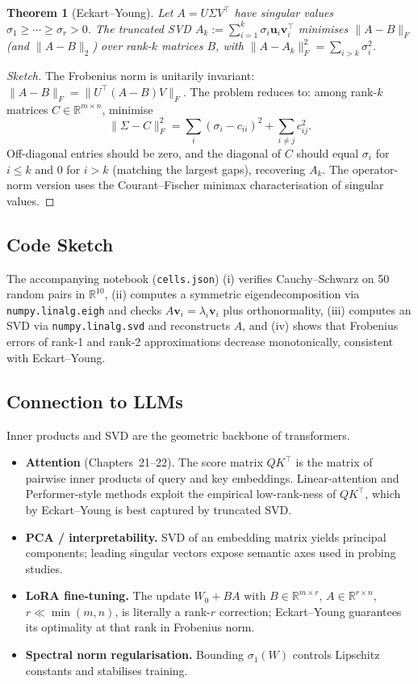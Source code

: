 \documentclass[11pt]{article}
\newtheorem{theorem}{Theorem}[section]
\theoremstyle{remark}
\begin{document}
\begin{theorem}[Eckart--Young]
Let $A=U\Sigma V^\top$ have singular values $\sigma_1\ge\cdots\ge\sigma_r>0$. The truncated SVD $A_k:=\sum_{i=1}^{k}\sigma_i\mathbf{u}_i\mathbf{v}_i^\top$ minimises $\|A-B\|_F$ (and $\|A-B\|_2$) over rank-$k$ matrices $B$, with $\|A-A_k\|_F^2=\sum_{i>k}\sigma_i^2$.
\end{theorem}
\begin{proof}[Sketch]
The Frobenius norm is unitarily invariant: $\|A-B\|_F=\|U^\top(A-B)V\|_F$. The problem reduces to: among rank-$k$ matrices $C\in\mathbb{R}^{m\times n}$, minimise
\[
\|\Sigma-C\|_F^2=\sum_i(\sigma_i-c_{ii})^2+\sum_{i\ne j}c_{ij}^2.
\]
Off-diagonal entries should be zero, and the diagonal of $C$ should equal $\sigma_i$ for $i\le k$ and $0$ for $i>k$ (matching the largest gaps), recovering $A_k$. The operator-norm version uses the Courant--Fischer minimax characterisation of singular values.
\end{proof}

\subsection*{Code Sketch}

The accompanying notebook (\texttt{cells.json}) (i) verifies Cauchy--Schwarz on 50 random pairs in $\mathbb{R}^{10}$, (ii) computes a symmetric eigendecomposition via \texttt{numpy.linalg.eigh} and checks $A\mathbf{v}_i=\lambda_i\mathbf{v}_i$ plus orthonormality, (iii) computes an SVD via \texttt{numpy.linalg.svd} and reconstructs $A$, and (iv) shows that Frobenius errors of rank-1 and rank-2 approximations decrease monotonically, consistent with Eckart--Young.

\subsection*{Connection to LLMs}

Inner products and SVD are the geometric backbone of transformers.

\begin{itemize}
  \item \textbf{Attention} (Chapters~21--22). The score matrix $QK^\top$ is the matrix of pairwise inner products of query and key embeddings. Linear-attention and Performer-style methods exploit the empirical low-rank-ness of $QK^\top$, which by Eckart--Young is best captured by truncated SVD.
  \item \textbf{PCA / interpretability.} SVD of an embedding matrix yields principal components; leading singular vectors expose semantic axes used in probing studies.
  \item \textbf{LoRA fine-tuning.} The update $W_0+BA$ with $B\in\mathbb{R}^{m\times r}$, $A\in\mathbb{R}^{r\times n}$, $r\ll\min(m,n)$, is literally a rank-$r$ correction; Eckart--Young guarantees its optimality at that rank in Frobenius norm.
  \item \textbf{Spectral norm regularisation.} Bounding $\sigma_1(W)$ controls Lipschitz constants and stabilises training.
\end{itemize}
\end{document}
